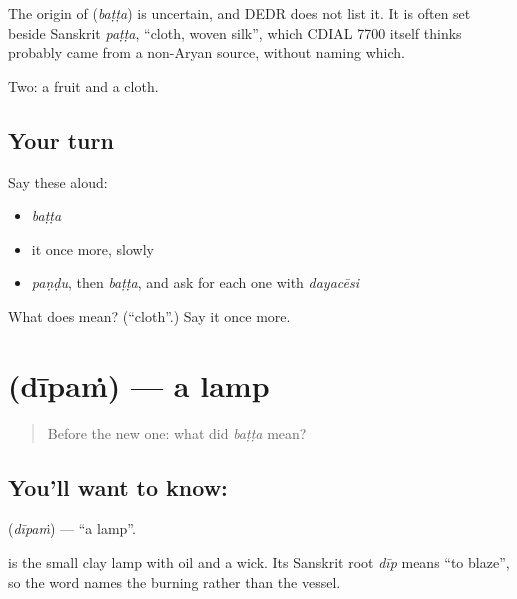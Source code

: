 \begin{cousinweb}
The origin of \textbf{} (\emph{baṭṭa}) is uncertain, and DEDR does not list it. It is often set beside Sanskrit \emph{paṭṭa}, \textquotedblleft{}cloth, woven silk\textquotedblright{}, which CDIAL 7700 itself thinks probably came from a non-Aryan source, without naming which.
\end{cousinweb}

\begin{grammarlens}[title={What you've built}]
Two: a fruit and a cloth.
\end{grammarlens}

\subsection*{Your turn}
Say these aloud:

\begin{itemize}
\raggedright
  \item \emph{baṭṭa}
  \item it once more, slowly
  \item \emph{paṇḍu}, then \emph{baṭṭa}, and ask for each one with \emph{dayacēsi}
\end{itemize}

\begin{tcolorbox}[breakable,colback=teal!4,colframe=teal!35!black,title={Before you move on}]
What does  mean? (\textquotedblleft{}cloth\textquotedblright{}.) Say it once more.
\end{tcolorbox}
\section[\texorpdfstring{\te{దీపం} (dīpaṁ)}{దీపం (dīpaṁ)}]{ (dīpaṁ) — a lamp}

\label{lesson:TE-C46-lamp}



\begin{quote}
Before the new one: what did \emph{baṭṭa} mean?
\end{quote}

\subsection*{You'll want to know: }
\textbf{} (\emph{dīpaṁ}) — \textquotedblleft{}a lamp\textquotedblright{}.

 is the small clay lamp with oil and a wick. Its Sanskrit root \emph{dīp} means \textquotedblleft{}to blaze\textquotedblright{}, so the word names the burning rather than the vessel.

